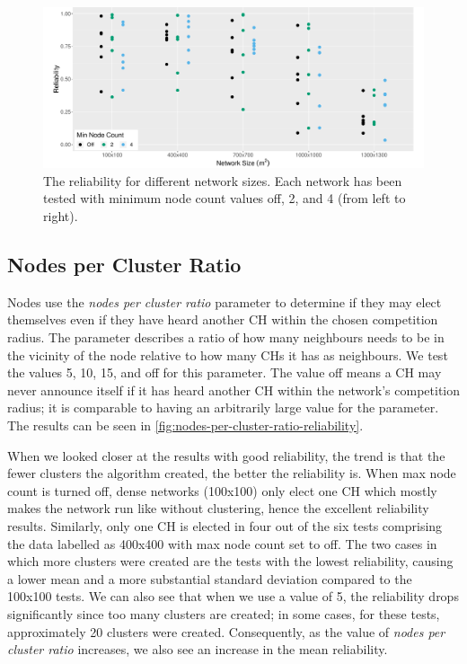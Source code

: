 \begin{figure}[bt]
    \centering
    \includegraphics[width=\textwidth, keepaspectratio]{figure/Results/ParameterEvaluation/MinNodeCount_Reliability.pdf}
    \caption{The reliability for different network sizes. Each network has been tested with minimum node count values off, 2, and 4 (from left to right).}
    \label{fig:min-node-count-reliability}
\end{figure}

\subsection{Nodes per Cluster Ratio}
Nodes use the \emph{nodes per cluster ratio} parameter to determine if they may elect themselves even if they have heard another CH within the chosen competition radius. The parameter describes a ratio of how many neighbours needs to be in the vicinity of the node relative to how many CHs it has as neighbours. We test the values 5, 10, 15, and off for this parameter. The value off means a CH may never announce itself if it has heard another CH within the network's competition radius; it is comparable to having an arbitrarily large value for the parameter. The results can be seen in \cref{fig:nodes-per-cluster-ratio-reliability}.


When we looked closer at the results with good reliability, the trend is that the fewer clusters the algorithm created, the better the reliability is. When max node count is turned off, dense networks (100x100) only elect one CH which mostly makes the network run like \atwo{} without clustering, hence the excellent reliability results. Similarly, only one CH is elected in four out of the six tests comprising the data labelled as 400x400 with max node count set to off. The two cases in which more clusters were created are the tests with the lowest reliability, causing a lower mean and a more substantial standard deviation compared to the 100x100 tests. We can also see that when we use a value of 5, the reliability drops significantly since too many clusters are created; in some cases, for these tests, approximately 20 clusters were created. Consequently, as the value of \emph{nodes per cluster ratio} increases, we also see an increase in the mean reliability.



